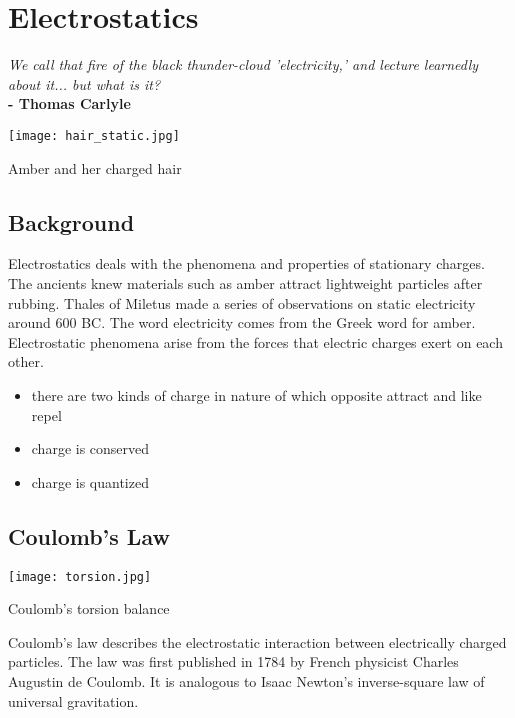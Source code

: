\chapter{Electrostatics}

\textit{We call that fire of the black thunder-cloud 'electricity,' and lecture learnedly about it... but what is it?}\\
\noindent\textbf{-   Thomas Carlyle}

\vspace{1cm}


\begin{marginfigure}%
  \texttt{[image: hair\_static.jpg]}
  \caption{Amber and her charged hair}
  \label{fig:marginfig}
\end{marginfigure}


\section{Background}
Electrostatics deals with the phenomena and properties of stationary charges.   The ancients knew materials such as amber attract lightweight particles after rubbing.   Thales of Miletus made a series of observations on static electricity around 600 BC.  The word electricity comes from the Greek word for amber.  Electrostatic phenomena arise from the forces that electric charges exert on each other.
\begin{itemize}
\item there are two kinds of charge in nature of which opposite attract and like repel
\item charge is conserved
\item charge is quantized
\end{itemize}

\section {Coulomb's Law}

\begin{marginfigure}%
  \texttt{[image: torsion.jpg]}
  \caption{Coulomb's torsion balance}
  \label{fig:marginfig}
\end{marginfigure}

Coulomb's law describes the electrostatic interaction between electrically charged particles. The law was first published in 1784 by French physicist Charles Augustin de Coulomb. It is analogous to Isaac Newton's inverse-square law of universal gravitation.

